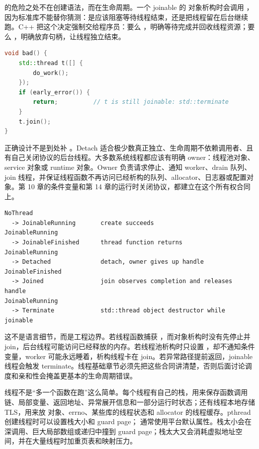  的危险之处不在创建语法，而在生命周期。一个 joinable 的  对象析构时会调用 ，因为标准库不能替你猜测：是应该阻塞等待线程结束，还是把线程留在后台继续跑。C++ 把这个决定强制交给程序员：要么 ，明确等待完成并回收线程资源；要么 ，明确放弃句柄，让线程独立结束。

\begin{lstlisting}[language=C++,caption={线程所有权错误：析构 joinable thread}]
void bad() {
    std::thread t([] {
        do_work();
    });
    if (early_error()) {
        return;          // t is still joinable: std::terminate
    }
    t.join();
}
\end{lstlisting}

正确设计不是到处补 。Detach 适合极少数真正独立、生命周期不依赖调用者、且有自己关闭协议的后台线程。大多数系统线程都应该有明确 owner：线程池对象、service 对象或 runtime 对象。Owner 负责请求停止、通知 worker、drain 队列、join 线程，并保证线程函数不再访问已经析构的队列、allocator、日志器或配置对象。第 10 章的条件变量和第 14 章的运行时关闭协议，都建立在这个所有权合同上。

\begin{lstlisting}[numbers=none,caption={join/detach 的最小状态机}]
NoThread
  -> JoinableRunning       create succeeds
JoinableRunning
  -> JoinableFinished      thread function returns
JoinableRunning
  -> Detached              detach, owner gives up handle
JoinableFinished
  -> Joined                join observes completion and releases handle
JoinableRunning
  -> Terminate             std::thread object destructor while joinable
\end{lstlisting}

这不是语言细节，而是工程边界。若线程函数捕获 ，而对象析构时没有先停止并 join，后台线程可能访问已经释放的内存。若线程池析构时只设置 ，却不通知条件变量，worker 可能永远睡着，析构线程卡在 join。若异常路径提前返回，joinable 线程会触发 terminate。线程基础章节必须先把这些合同讲清楚，否则后面讨论调度和亲和性会掩盖更基本的生命周期错误。

线程不是“多一个函数在跑”这么简单。每个线程有自己的栈，用来保存函数调用链、局部变量、返回地址、异常展开信息和一部分运行时状态；还有线程本地存储 TLS，用来放  对象、errno、某些库的线程状态和 allocator 的线程缓存。pthread 创建线程时可以设置栈大小和 guard page； 通常使用平台默认属性。栈太小会在深调用、巨大局部数组或递归中撞到 guard page；栈太大又会消耗虚拟地址空间，并在大量线程时加重页表和映射压力。

